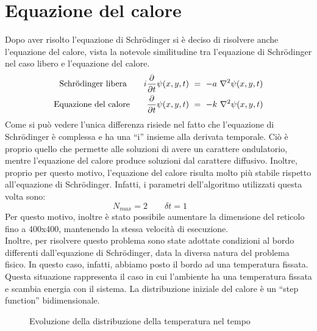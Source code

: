  \section{Equazione del calore}
 Dopo aver risolto l'equazione di Schr\"{o}dinger si è deciso di risolvere anche l'equazione del calore, vista la notevole similitudine tra l'equazione di Schr\"{o}dinger nel caso libero
 e l'equazione del calore.
 \begin{align}
  \mbox{Schr\"{o}dinger libera} \qquad i \p{}{t} \psi(x,y,t) \ & = \ - a \ \nabla^2 \psi (x,y,t) \\
  \mbox{Equazione del calore} \qquad \p{}{t} \psi(x,y,t) \ & = \ - k \ \nabla^2 \psi (x,y,t)
 \end{align} 
Come si può vedere l'unica differenza risiede nel fatto che l'equazione di Schr\"{o}dinger è complessa e ha una ``i'' insieme alla derivata temporale.
Ciò è proprio quello che permette alle soluzioni di avere un carattere ondulatorio, mentre l'equazione del calore produce soluzioni dal carattere diffusivo.
Inoltre, proprio per questo motivo, l'equazione del calore risulta molto più stabile rispetto all'equazione di Schr\"{o}dinger. Infatti, i parametri dell'algoritmo utilizzati questa volta sono:
$$
 N_{max} = 2 \qquad \delta t = 1 \qquad  
$$
 Per questo motivo, inoltre è stato possibile aumentare la dimensione del reticolo fino a 400x400, mantenendo la stessa velocità di esecuzione.\\
 Inoltre, per risolvere questo problema sono state adottate condizioni al bordo differenti dall'equazione di Schr\"{o}dinger, data la diversa natura del problema fisico.
 In questo caso, infatti, abbiamo posto il bordo ad una temperatura fissata. Questa situazione rappresenta il caso in cui l'ambiente ha una temperatura fissata e scambia energia con il sistema.
 La distribuzione iniziale del calore è un ``step function'' bidimensionale.
 \begin{figure}[hbp]
  \centering
  \caption{\small{Evoluzione della distribuzione della temperatura nel tempo}}
 \end{figure}
 
